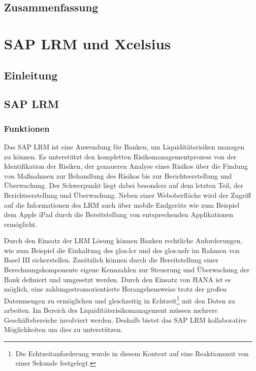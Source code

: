 \section{Zusammenfassung}

\chapter{SAP LRM und Xcelsius}
\section{Einleitung}
\section{SAP LRM}

\subsection{Funktionen}
Das SAP LRM ist eine Anwendung für Banken, um Liquiditätsrisiken managen zu können. Es unterstützt den kompletten Risikomanagementprozess von der Identifikation der Risiken, der genaueren Analyse eines Risikos über die Findung von Maßnahmen zur Behandlung des Risikos bis zur Berichtserstellung und Überwachung. Der Schwerpunkt liegt dabei besonders auf dem letzten Teil, der Berichtserstellung und Überwachung. Neben einer Weboberfläche wird der Zugriff auf die Informationen des LRM auch über mobile Endgeräte wie zum Beispiel dem Apple iPad durch die Bereitstellung von entsprechenden Applikationen ermöglicht.

Durch den Einsatz der LRM Lösung können Banken rechtliche Anforderungen, wie zum Beispiel die Einhaltung des \gls{glos:lcr} und des \gls{glos:nsfr} im Rahmen von Basel III sicherstellen. Zusätzlich können durch die Bereitstellung einer Berechnungskomponente eigene Kennzahlen zur Steuerung und Überwachung der Bank definiert und umgesetzt werden. Durch den Einsatz von \gls{HANA} ist es möglich, eine zahlungsstromorientierte Herangehensweise trotz der großen Datenmengen zu ermöglichen und gleichzeitig in Echtzeit\footnote{Die Echtzeitanforderung wurde in diesem Kontext auf eine Reaktionszeit von einer Sekunde festgelegt.} mit den Daten zu arbeiten. Im Bereich des Liquiditätsrisikomanagement müssen mehrere Geschäftsbereiche involviert werden. Deshalb bietet das SAP LRM kollaborative Möglichkeiten um dies zu unterstützen.

